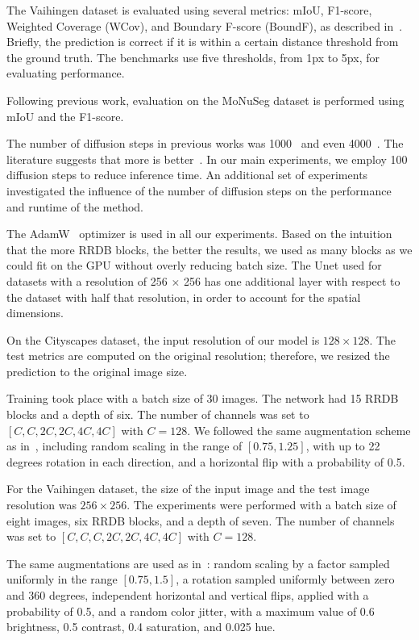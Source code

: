 \documentclass[10pt,twocolumn,letterpaper]{article}
\begin{document}
The Vaihingen dataset is evaluated using several metrics: mIoU, F1-score, Weighted Coverage (WCov), and Boundary F-score (BoundF), as described in~\cite{cheng2019darnet}. Briefly, the prediction is
correct if it is within a certain distance threshold from the
ground truth. The benchmarks use five thresholds, from 1px to 5px, for evaluating performance.

Following previous work, evaluation on the MoNuSeg dataset is performed using mIoU and the F1-score.

The number of diffusion steps in previous works was 1000~\cite{ho2020denoising} and even 4000~\cite{nichol2021improved}. The literature suggests that more is better~\cite{san2021noise}. In our main experiments, we employ 100 diffusion steps to reduce inference time. An additional set of experiments investigated the influence of the number of diffusion steps on the performance and runtime of the method.

The  AdamW~\cite{loshchilov2017decoupled} optimizer is used in all our experiments. Based on the intuition that the more RRDB blocks, the better the results, we used as many blocks as we could fit on the GPU without overly reducing batch size. The Unet used for datasets with a resolution of 256 $\times$ 256 has one additional layer with respect to the dataset with half that resolution, in order to account for the spatial dimensions.

On the Cityscapes dataset, the input resolution of our model is $128 \times 128$. The test metrics are computed on the original resolution; therefore, we resized the prediction to the original image size. 

Training took place with a batch size of 30 images. The network had 15 RRDB blocks and a depth of six. The number of channels was set to $[C, C, 2C, 2C, 4C, 4C]$ with $C=128$. 
We followed the same augmentation scheme as in~\cite{gur2019end}, including random scaling in the range of $[0.75, 1.25]$, with up to 22 degrees rotation in each direction, and a horizontal flip with a probability of 0.5.

For the Vaihingen dataset, the size of the input image and the test image resolution was $256 \times 256$. The experiments were performed with a batch size of eight images, six RRDB blocks, and a depth of seven. The number of channels was set to $[C, C, C, 2C, 2C, 4C, 4C]$ with $C=128$. 

The same augmentations are used as in~\cite{cheng2019darnet}: random scaling by a factor sampled uniformly in the range $[0.75, 1.5]$, a rotation sampled uniformly between zero and 360 degrees, independent horizontal and vertical flips, applied with a probability of 0.5, and a random color jitter, with a maximum value of 0.6 brightness, 0.5 contrast, 0.4 saturation, and 0.025 hue.
\end{document}
